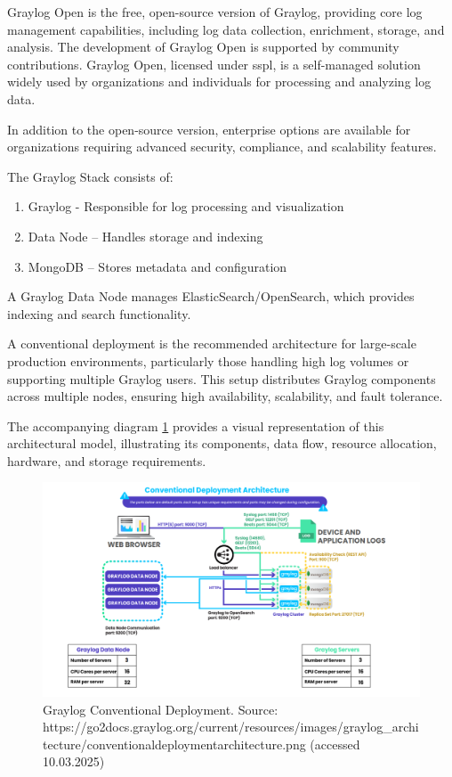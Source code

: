 \documentclass[../main.tex]{subfiles}
\begin{document}
Graylog Open is the free, open-source version of Graylog, providing core log management capabilities, including log data collection, enrichment, storage, and analysis. The development of Graylog Open is supported by community contributions. Graylog Open, licensed under \gls{sspl}, is a self-managed solution widely used by organizations and individuals for processing and analyzing log data. 

In addition to the open-source version, enterprise options are available for organizations requiring advanced security, compliance, and scalability features.

The Graylog Stack consists of:  

\begin{enumerate}
    \item{Graylog} - Responsible for log processing and visualization 
    \item{Data Node} – Handles storage and indexing
    \item{MongoDB} – Stores metadata and configuration
\end{enumerate} 

A Graylog Data Node manages ElasticSearch/OpenSearch, which provides indexing and search functionality.  

A conventional deployment is the recommended architecture for large-scale production environments, particularly those handling high log volumes or supporting multiple Graylog users. This setup distributes Graylog components across multiple nodes, ensuring high availability, scalability, and fault tolerance.  

The accompanying diagram \ref{fig:graylog_deployment} provides a visual representation of this architectural model, illustrating its components, data flow, resource allocation, hardware, and storage requirements.

\begin{figure}[H]
    \centering
    \includegraphics[scale=0.35]{img/3-background/graylog/deployment.png}
    \caption{Graylog Conventional Deployment. Source: https://go2docs.graylog.org/current/resources/images/graylog\_architecture/conventionaldeploymentarchitecture.png (accessed 10.03.2025)}
    \label{fig:graylog_deployment}
\end{figure}
\end{document}
